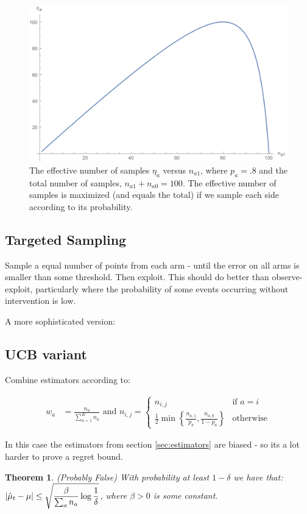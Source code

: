 \documentclass{article}
\newcommand{\set}[1]{\left\{#1\right\}}
\newcommand{\eq}[1]{\begin{align*}#1\end{align*}}
\theoremstyle{plain}
\newtheorem{theorem}{Theorem}
\theoremstyle{definition}
\begin{document}
\begin{figure}[H]
\centering
\caption{The effective number of samples $\eta_a$ versus $n_{a1}$, where $p_a = .8$ and the total number of samples,  $ n_{a1}+n_{a0}=100$. The effective number of samples is maximized (and equals the total) if we sample each side according to its probability.}
\includegraphics[width=.5\textwidth]{samplehalves}
\end{figure}

\subsection{Targeted Sampling}
Sample a equal number of points from each arm - until the error on all arms is smaller than some threshold. Then exploit. This should do better than observe-exploit, particularly where the probability of some events occurring without intervention is low.

A more sophisticated version:





\subsection{UCB variant}
Combine estimators according to:

\eq {
w_a     &= \frac{n_a}{\sum_{a=1}^K n_a} \text{ and } n_{i,j}=\begin{cases} 
n_{i,j} & \text{if } a = i \\
\frac{1}{2}\min\set{\frac{n_{a,1}}{p_a}, \frac{n_{a,0}}{1-p_a}}  & \text{otherwise}
\end{cases}
}

In this case the estimators from section \ref{sec:estimators} are biased - so its a lot harder to prove a regret bound. 

\begin{theorem} (Probably False) With probability at least $1 - \delta$ we have that:
$\displaystyle \left|\hat{\mu}_t - \mu\right| \leq \sqrt{\frac{\beta}{\sum_{a} n_a} \log{1 \over \delta}}$,
where $\beta > 0$ is some constant.
\end{theorem}
\end{document}
